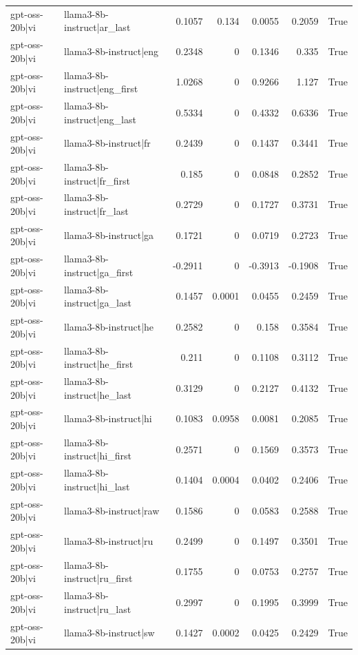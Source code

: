\begin{table}
\begin{tabular}{l l r r r r l}
gpt-oss-20b|vi & llama3-8b-instruct|ar_last & 0.1057 & 0.134 & 0.0055 & 0.2059 & True \\
gpt-oss-20b|vi & llama3-8b-instruct|eng & 0.2348 & 0 & 0.1346 & 0.335 & True \\
gpt-oss-20b|vi & llama3-8b-instruct|eng_first & 1.0268 & 0 & 0.9266 & 1.127 & True \\
gpt-oss-20b|vi & llama3-8b-instruct|eng_last & 0.5334 & 0 & 0.4332 & 0.6336 & True \\
gpt-oss-20b|vi & llama3-8b-instruct|fr & 0.2439 & 0 & 0.1437 & 0.3441 & True \\
gpt-oss-20b|vi & llama3-8b-instruct|fr_first & 0.185 & 0 & 0.0848 & 0.2852 & True \\
gpt-oss-20b|vi & llama3-8b-instruct|fr_last & 0.2729 & 0 & 0.1727 & 0.3731 & True \\
gpt-oss-20b|vi & llama3-8b-instruct|ga & 0.1721 & 0 & 0.0719 & 0.2723 & True \\
gpt-oss-20b|vi & llama3-8b-instruct|ga_first & -0.2911 & 0 & -0.3913 & -0.1908 & True \\
gpt-oss-20b|vi & llama3-8b-instruct|ga_last & 0.1457 & 0.0001 & 0.0455 & 0.2459 & True \\
gpt-oss-20b|vi & llama3-8b-instruct|he & 0.2582 & 0 & 0.158 & 0.3584 & True \\
gpt-oss-20b|vi & llama3-8b-instruct|he_first & 0.211 & 0 & 0.1108 & 0.3112 & True \\
gpt-oss-20b|vi & llama3-8b-instruct|he_last & 0.3129 & 0 & 0.2127 & 0.4132 & True \\
gpt-oss-20b|vi & llama3-8b-instruct|hi & 0.1083 & 0.0958 & 0.0081 & 0.2085 & True \\
gpt-oss-20b|vi & llama3-8b-instruct|hi_first & 0.2571 & 0 & 0.1569 & 0.3573 & True \\
gpt-oss-20b|vi & llama3-8b-instruct|hi_last & 0.1404 & 0.0004 & 0.0402 & 0.2406 & True \\
gpt-oss-20b|vi & llama3-8b-instruct|raw & 0.1586 & 0 & 0.0583 & 0.2588 & True \\
gpt-oss-20b|vi & llama3-8b-instruct|ru & 0.2499 & 0 & 0.1497 & 0.3501 & True \\
gpt-oss-20b|vi & llama3-8b-instruct|ru_first & 0.1755 & 0 & 0.0753 & 0.2757 & True \\
gpt-oss-20b|vi & llama3-8b-instruct|ru_last & 0.2997 & 0 & 0.1995 & 0.3999 & True \\
gpt-oss-20b|vi & llama3-8b-instruct|sw & 0.1427 & 0.0002 & 0.0425 & 0.2429 & True \\

\end{tabular}
\end{table}
